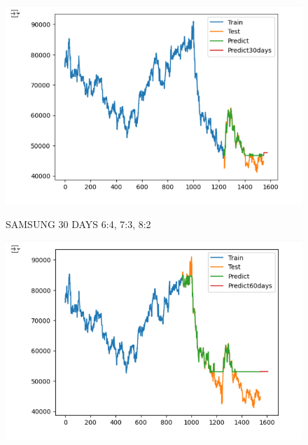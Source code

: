 \documentclass{article}
\begin{document}
\begin{multicols}{2}
\begin{figure}[H]
\begin{minipage}{0.15\textwidth}
    \label{fig:2}
    \end{minipage}%
    \begin{minipage}{0.15\textwidth}
    \centering
    \includegraphics[width=1\textwidth]{Image/GradientBoosting/SAMSUNG_30_8_2_GradientBoostingRegressor.png}

    \label{fig:3}
    \end{minipage}
    \caption{SAMSUNG 30 DAYS  6:4, 7:3, 8:2 }
\end{figure}

\begin{figure}[H]
    \centering
    \begin{minipage}{0.15\textwidth}
    \centering
    \includegraphics[width=1\textwidth]{Image/GradientBoosting/SAMSUNG_60_6_4_GradientBoostingRegressor.png}
   

\end{minipage}
\end{figure}
\end{multicols}
\end{document}

